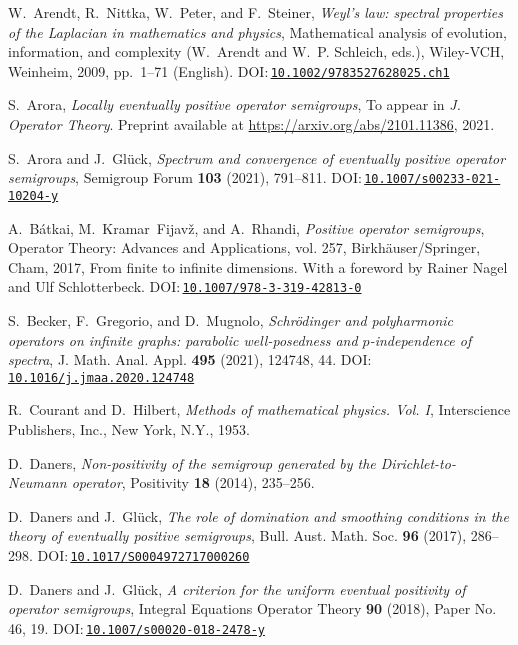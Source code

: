 \documentclass[a4paper, reqno]{amsart}
\numberwithin{equation}{section}
\theoremstyle{plain}
\theoremstyle{definition}
\theoremstyle{remark}
\begin{document}
\begin{thebibliography}{10}
W.~Arendt, R.~Nittka, W.~Peter, and F.~Steiner, \emph{{Weyl's} law: spectral
  properties of the {L}aplacian in mathematics and physics}, Mathematical
  analysis of evolution, information, and complexity (W.~Arendt and W.~P.
  Schleich, eds.), Wiley-VCH, Weinheim, 2009, pp.~1--71 (English).
  DOI:\,\href{https://doi.org/10.1002/9783527628025.ch1}{\nolinkurl{10.1002/9783527628025.ch1}}

S.~Arora, \emph{Locally eventually positive operator semigroups}, To appear in
  \textit{J. Operator Theory}. Preprint available at
  \url{https://arxiv.org/abs/2101.11386}, 2021.

S.~Arora and J.~Gl\"{u}ck, \emph{Spectrum and convergence of eventually
  positive operator semigroups}, Semigroup Forum \textbf{103} (2021), 791--811.
  DOI:\,\href{https://doi.org/10.1007/s00233-021-10204-y}{\nolinkurl{10.1007/s00233-021-10204-y}}

A.~B\'{a}tkai, M.~Kramar~Fijav\v{z}, and A.~Rhandi, \emph{Positive operator
  semigroups}, Operator Theory: Advances and Applications, vol. 257,
  Birkh\"{a}user/Springer, Cham, 2017, From finite to infinite dimensions. With
  a foreword by Rainer Nagel and Ulf Schlotterbeck.
  DOI:\,\href{https://doi.org/10.1007/978-3-319-42813-0}{\nolinkurl{10.1007/978-3-319-42813-0}}

S.~Becker, F.~Gregorio, and D.~Mugnolo, \emph{Schr\"{o}dinger and polyharmonic
  operators on infinite graphs: parabolic well-posedness and {$p$}-independence
  of spectra}, J. Math. Anal. Appl. \textbf{495} (2021), 124748, 44.
  DOI:\,\href{https://doi.org/10.1016/j.jmaa.2020.124748}{\nolinkurl{10.1016/j.jmaa.2020.124748}}

R.~Courant and D.~Hilbert, \emph{Methods of mathematical physics. {V}ol. {I}},
  Interscience Publishers, Inc., New York, N.Y., 1953.

D.~Daners, \emph{Non-positivity of the semigroup generated by the
  {D}irichlet-to-{N}eumann operator}, Positivity \textbf{18} (2014), 235--256.

D.~Daners and J.~Gl\"{u}ck, \emph{The role of domination and smoothing
  conditions in the theory of eventually positive semigroups}, Bull. Aust.
  Math. Soc. \textbf{96} (2017), 286--298.
  DOI:\,\href{https://doi.org/10.1017/S0004972717000260}{\nolinkurl{10.1017/S0004972717000260}}

D.~Daners and J.~Gl\"{u}ck, \emph{A criterion for the uniform eventual
  positivity of operator semigroups}, Integral Equations Operator Theory
  \textbf{90} (2018), Paper No. 46, 19.
  DOI:\,\href{https://doi.org/10.1007/s00020-018-2478-y}{\nolinkurl{10.1007/s00020-018-2478-y}}


\end{thebibliography}
\end{document}
